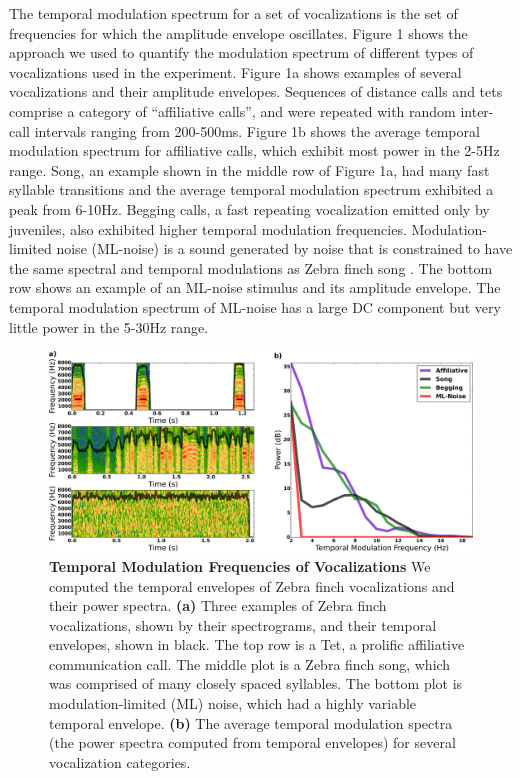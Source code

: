 The temporal modulation spectrum for a set of vocalizations is the set of frequencies for which the amplitude envelope oscillates. Figure 1 shows the approach we used to quantify the modulation spectrum of different types of vocalizations used in the experiment. Figure 1a shows examples of several vocalizations and their amplitude envelopes. Sequences of distance calls and tets comprise a category of ``affiliative calls'', and were repeated with random inter-call intervals ranging from 200-500ms. Figure 1b shows the average temporal modulation spectrum for affiliative calls, which exhibit most power in the 2-5Hz range. Song, an example shown in the middle row of Figure 1a, had many fast syllable transitions and the average temporal modulation spectrum exhibited a peak from 6-10Hz. Begging calls, a fast repeating vocalization emitted only by juveniles, also exhibited higher temporal modulation frequencies. Modulation-limited noise (ML-noise) is a sound generated by noise that is constrained to have the same spectral and temporal modulations as Zebra finch song \cite{Hsu2004b}. The bottom row shows an example of an ML-noise stimulus and its amplitude envelope. The temporal modulation spectrum of ML-noise has a large DC component but very little power in the 5-30Hz range.

\begin{figure}
    \caption{\textbf{Temporal Modulation Frequencies of Vocalizations} We computed the temporal envelopes of Zebra finch vocalizations and their power spectra. \textbf{(a)} Three examples of Zebra finch vocalizations, shown by their spectrograms, and their temporal envelopes, shown in black. The top row is a Tet, a prolific affiliative communication call. The middle plot is a Zebra finch song, which was comprised of many closely spaced syllables. The bottom plot is modulation-limited (ML) noise, which had a highly variable temporal envelope. \textbf{(b)} The average temporal modulation spectra (the power spectra computed from temporal envelopes) for several vocalization categories.}
    \centering
    \includegraphics[scale=0.25]{figure_2_1.eps}
\end{figure}

